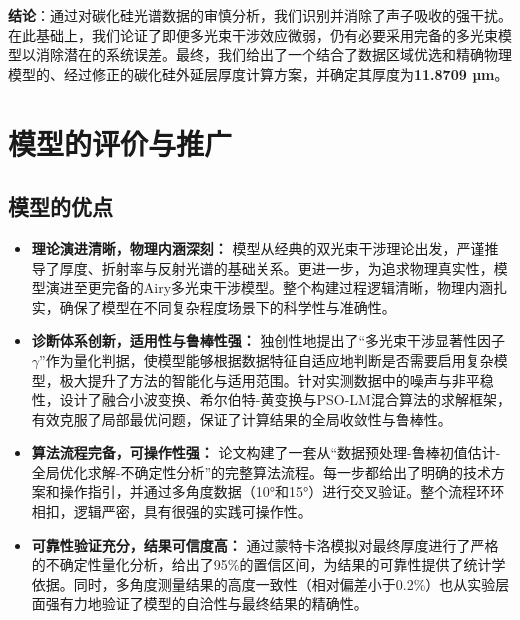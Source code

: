 \documentclass[withoutpreface,bwprint]{cumcmthesis} %
\begin{document}
\textbf{结论}：通过对碳化硅光谱数据的审慎分析，我们识别并消除了声子吸收的强干扰。在此基础上，我们论证了即便多光束干涉效应微弱，仍有必要采用完备的多光束模型以消除潜在的系统误差。最终，我们给出了一个结合了数据区域优选和精确物理模型的、经过修正的碳化硅外延层厚度计算方案，并确定其厚度为\textbf{11.8709 µm}。




\section{模型的评价与推广}

\subsection{模型的优点}
\begin{itemize}
    \item \textbf{理论演进清晰，物理内涵深刻：} 模型从经典的双光束干涉理论出发，严谨推导了厚度、折射率与反射光谱的基础关系。更进一步，为追求物理真实性，模型演进至更完备的Airy多光束干涉模型。整个构建过程逻辑清晰，物理内涵扎实，确保了模型在不同复杂程度场景下的科学性与准确性。

    \item \textbf{诊断体系创新，适用性与鲁棒性强：} 独创性地提出了“多光束干涉显著性因子$\gamma$”作为量化判据，使模型能够根据数据特征自适应地判断是否需要启用复杂模型，极大提升了方法的智能化与适用范围。针对实测数据中的噪声与非平稳性，设计了融合小波变换、希尔伯特-黄变换与PSO-LM混合算法的求解框架，有效克服了局部最优问题，保证了计算结果的全局收敛性与鲁棒性。

    \item \textbf{算法流程完备，可操作性强：} 论文构建了一套从“数据预处理-鲁棒初值估计-全局优化求解-不确定性分析”的完整算法流程。每一步都给出了明确的技术方案和操作指引，并通过多角度数据（10°和15°）进行交叉验证。整个流程环环相扣，逻辑严密，具有很强的实践可操作性。

    \item \textbf{可靠性验证充分，结果可信度高：} 通过蒙特卡洛模拟对最终厚度进行了严格的不确定性量化分析，给出了95\%的置信区间，为结果的可靠性提供了统计学依据。同时，多角度测量结果的高度一致性（相对偏差小于0.2\%）也从实验层面强有力地验证了模型的自洽性与最终结果的精确性。
\end{itemize}

\end{document}

